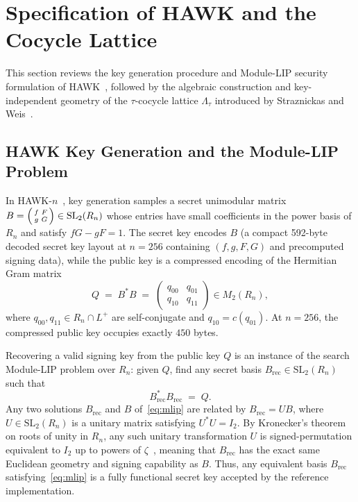 \documentclass[11pt,a4paper]{article}
\theoremstyle{definition}
\newcommand{\Lt}{\Lambda_\tau}
\begin{document}
\section{Specification of HAWK and the Cocycle Lattice}
\label{sec:spec}

This section reviews the key generation procedure and Module-LIP security formulation of HAWK~\cite{DPPvW22,HAWK25}, followed by the algebraic construction and key-independent geometry of the $\tau$-cocycle lattice $\Lt$ introduced by Straznickas and Weis~\cite{SW26}.

\subsection{HAWK Key Generation and the Module-LIP Problem}
In HAWK-$n$~\cite{DPPvW22,HAWK25}, key generation samples a secret unimodular matrix $B = \begin{psmallmatrix} f & F \\ g & G \end{psmallmatrix} \in \mathrm{SL}_2(R_n)$ whose entries have small coefficients in the power basis of $R_n$ and satisfy $fG - gF = 1$. The secret key encodes $B$ (a compact 592-byte decoded secret key layout at $n=256$ containing $(f, g, F, G)$ and precomputed signing data), while the public key is a compressed encoding of the Hermitian Gram matrix
\[
  Q \;=\; B^* B \;=\; \begin{pmatrix} q_{00} & q_{01} \\ q_{10} & q_{11} \end{pmatrix} \in M_2(R_n),
\]
where $q_{00}, q_{11} \in R_n \cap L^+$ are self-conjugate and $q_{10} = c(q_{01})$. At $n=256$, the compressed public key occupies exactly $450$ bytes.

Recovering a valid signing key from the public key $Q$ is an instance of the search Module-LIP problem over $R_n$: given $Q$, find any secret basis $B_{\mathrm{rec}} \in \mathrm{SL}_2(R_n)$ such that
\begin{equation}\label{eq:mlip}
  B_{\mathrm{rec}}^* B_{\mathrm{rec}} \;=\; Q.
\end{equation}
Any two solutions $B_{\mathrm{rec}}$ and $B$ of~\eqref{eq:mlip} are related by $B_{\mathrm{rec}} = U B$, where $U \in \mathrm{SL}_2(R_n)$ is a unitary matrix satisfying $U^* U = I_2$. By Kronecker's theorem on roots of unity in $R_n$, any such unitary transformation $U$ is signed-permutation equivalent to $I_2$ up to powers of $\zeta$~\cite{DW22,DPPvW22}, meaning that $B_{\mathrm{rec}}$ has the exact same Euclidean geometry and signing capability as $B$. Thus, any equivalent basis $B_{\mathrm{rec}}$ satisfying~\eqref{eq:mlip} is a fully functional secret key accepted by the reference implementation.
\end{document}
